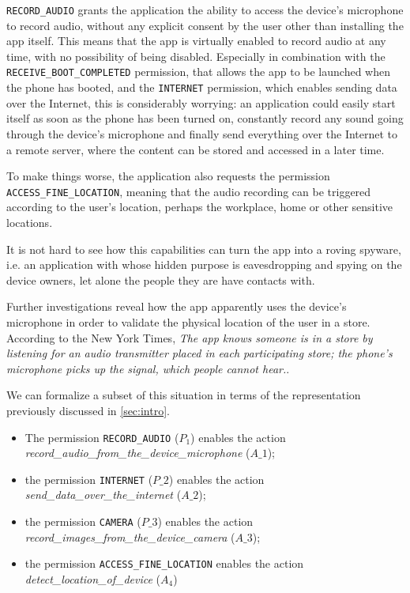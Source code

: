 \documentclass[twoside,letterpaper]{soups}
\theoremstyle{definition}
\begin{document}
\texttt{RECORD\_AUDIO} grants the application the ability to access the device's microphone to record audio, without any explicit consent by the user other than installing the app itself. This means that the app is virtually enabled to record audio at any time, with no possibility of being disabled. Especially in combination with the \texttt{RECEIVE\_BOOT\_COMPLETED} permission, that allows the app to be launched when the phone has booted, and the \texttt{INTERNET} permission, which enables sending data over the Internet, this is considerably worrying: an application could easily start itself as soon as the phone has been turned on, constantly record any sound going through the device's microphone and finally send everything over the Internet to a remote server, where the content can be stored and accessed in a later time.

To make things worse, the application also requests the permission \texttt{ACCESS\_FINE\_LOCATION}, meaning that the audio recording can be triggered according to the user's location, perhaps the workplace, home or other sensitive locations.

It is not hard to see how this capabilities can turn the app into a roving spyware, i.e. an application with whose hidden purpose is eavesdropping and spying on the device owners, let alone the people they are have contacts with.

Further investigations reveal how the app apparently uses the device's microphone in order to validate the physical location of the user in a store. According to the New York Times, \emph{The app knows someone is in a store by listening for an audio transmitter placed in each participating store; the phone’s microphone picks up the signal, which people cannot hear.}.

We can formalize a subset of this situation in terms of the representation previously discussed in \autoref{sec:intro}.
\begin{itemize}
    \item The permission \texttt{RECORD\_AUDIO} ($P_1$) enables the action \\ \emph{record\_audio\_from\_the\_device\_microphone} ($A\_1$);
    \item the permission \texttt{INTERNET} ($P\_2$) enables the action \\ \emph{send\_data\_over\_the\_internet} ($A\_2$);
    \item the permission \texttt{CAMERA} ($P\_3$) enables the action \\ \emph{record\_images\_from\_the\_device\_camera} ($A\_3$);
    \item the permission \texttt{ACCESS\_FINE\_LOCATION} enables the action \\ \emph{detect\_location\_of\_device} ($A_4$)
\end{itemize}
\end{document}

